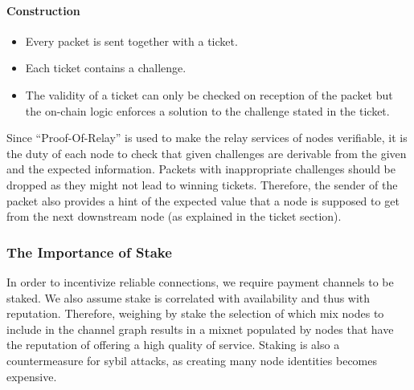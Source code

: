 \paragraph{Construction} 
\begin{itemize}
    \item Every packet is sent together with a ticket. 
    \item Each ticket contains a challenge.
    \item The validity of a ticket can only be checked on reception of the packet but the on-chain logic enforces a solution to the challenge stated in the ticket.
\end{itemize}
Since “Proof-Of-Relay” is used to make the relay services of nodes verifiable, it is the duty of each node to check that given challenges are derivable from the given and the expected information. 
Packets with inappropriate challenges should be dropped as they might not lead to winning tickets.
Therefore, the sender of the packet also provides a hint of the expected value that a node is supposed to get from the next downstream node (as explained in the ticket section). 



\subsubsection{The Importance of Stake}
In order to incentivize reliable connections, we require payment channels to be staked. We also assume stake is correlated with availability and thus with reputation. Therefore, weighing by stake the selection of which mix nodes to include in the channel graph results in a mixnet populated by nodes that have the reputation of offering a high quality of service.
 Staking is also a countermeasure for sybil attacks, as creating many node identities becomes expensive. 








